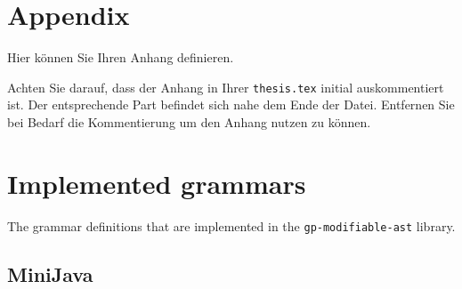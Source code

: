 \section{Appendix}

Hier können Sie Ihren Anhang definieren.

Achten Sie darauf, dass der Anhang in Ihrer \texttt{thesis.tex}
initial auskommentiert ist.
Der entsprechende Part befindet sich nahe dem Ende der Datei.
Entfernen Sie bei Bedarf die Kommentierung um den Anhang nutzen zu können.


\section{Implemented grammars}

The grammar definitions that are implemented in the \verb|gp-modifiable-ast| library.

\subsection{MiniJava}

